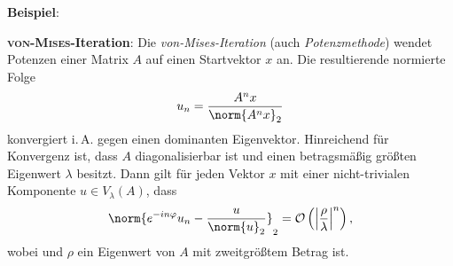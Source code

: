 \textbf{Beispiel}:

\linie

\textbf{\textsc{von-Mises}-Iteration}:
Die \emph{von-Mises-Iteration} (auch \emph{Potenzmethode}) wendet Potenzen
einer Matrix $A$ auf einen Startvektor $x$ an.
Die resultierende normierte Folge
\begin{align*}
    u_n = \frac{A^n x}{\norm{A^n x}_2}
\end{align*}
konvergiert i.\,A. gegen einen dominanten Eigenvektor.
Hinreichend für Konvergenz ist, dass $A$ diagonalisierbar ist und einen
betragsmäßig größten Eigenwert $\lambda$ besitzt.
Dann gilt für jeden Vektor $x$ mit einer nicht-trivialen Komponente
$u \in V_\lambda(A)$, dass
\begin{align*}
    \norm{e^{-in\varphi}u_n - \frac{u}{\norm{u}_2}}_2 =
    \O\left(\left|\frac{\rho}{\lambda}\right|^n\right),
\end{align*}
wobei  und $\rho$ ein
Eigenwert von $A$ mit zweitgrößtem Betrag ist.

